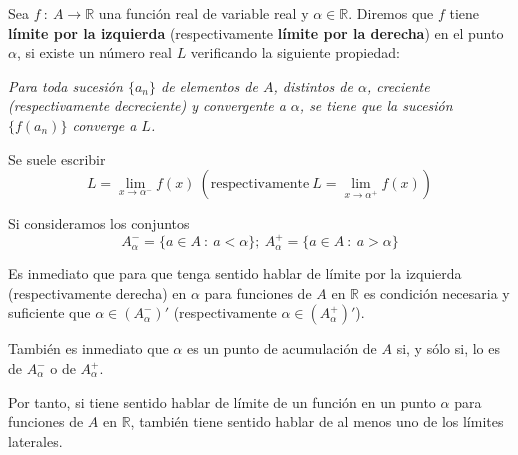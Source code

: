 \begin{definicion}
    Sea $f ~:~ A \longrightarrow \mathbb{R}$ una función real de variable real y $\alpha \in \mathbb{R}$.
    Diremos que $f$ tiene \textbf{límite por la izquierda} (respectivamente \textbf{límite por la derecha}) en el punto $\alpha$, si existe un número real $L$ verificando la siguiente propiedad:
    
    \emph{Para toda sucesión $\{a_n\}$ de elementos de $A$, distintos de $\alpha$, creciente (respectivamente decreciente) y convergente
    a $\alpha$, se tiene que la sucesión $\{f(a_n)\}$ converge a $L$.}
    
    Se suele escribir
    \begin{equation*}
        L = \lim_{x \to \alpha^{-}} f(x) ~ (\text{respectivamente} ~  L = \lim_{x \to \alpha^{+}} f(x))
    \end{equation*}
\end{definicion}

Si consideramos los conjuntos
\begin{equation*}
    A_{\alpha}^{-} = \{a \in A ~:~ a < \alpha\}; ~ A_{\alpha}^{+} = \{a \in A ~:~ a > \alpha\}
\end{equation*}

Es inmediato que para que tenga sentido hablar de límite por la izquierda (respectivamente derecha) en $\alpha$ para funciones de $A$ en $\mathbb{R}$ es condición necesaria y suficiente que $\alpha \in (A_{\alpha}^{-})'$ (respectivamente $\alpha \in (A_{\alpha}^{+})'$).

También es inmediato que $\alpha$ es un punto de acumulación de $A$ si, y sólo si, lo es de $A_{\alpha}^{-}$ o de $A_{\alpha}^{+}$.

Por tanto, si tiene sentido hablar de límite de un función en un punto $\alpha$ para funciones de $A$ en $\mathbb{R}$, también tiene sentido hablar de al menos uno de los límites laterales.

